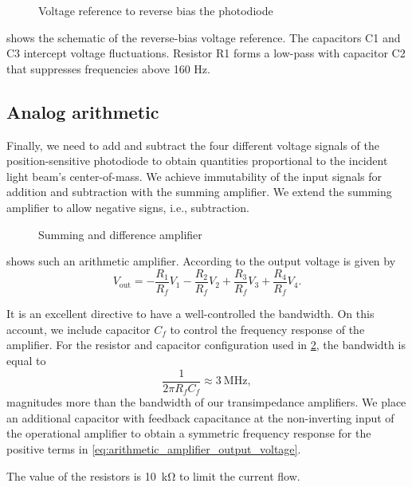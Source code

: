 \begin{figure}[H]
	\centering
	
	\caption{Voltage reference to reverse bias the photodiode}\label{fig:voltage_reference}
\end{figure}

 shows the schematic of the reverse-bias voltage reference.
The capacitors C1 and C3 intercept voltage fluctuations. 
Resistor R1 forms a low-pass with capacitor C2 that suppresses frequencies above 160 Hz.

\subsection{Analog arithmetic}

Finally, we need to add and subtract the four different voltage signals of the position-sensitive photodiode to obtain quantities proportional to the incident light beam's center-of-mass.
We achieve immutability of the input signals for addition and subtraction with the summing amplifier.
We extend the summing amplifier to allow negative signs, i.e., subtraction.

\begin{figure}[H]
	\centering
	
	\caption{Summing and difference amplifier}\label{fig:amplifier_arithmetic}
\end{figure}

 shows such an arithmetic amplifier.
According to \cite[p. 5]{Tietze15} the output voltage is given by
\begin{equation}
	V_\text{out}=-\frac{R_1}{R_f}V_1-\frac{R_2}{R_f}V_2+\frac{R_3}{R_f}V_3+\frac{R_4}{R_f}V_4.
	\label{eq:arithmetic_amplifier_output_voltage}
\end{equation}

It is an excellent directive to have a well-controlled the bandwidth.
On this account, we include capacitor $C_f$ to control the frequency response of the amplifier. 
For the resistor and capacitor configuration used in \cref{fig:amplifier_arithmetic}, the bandwidth is equal to
\begin{equation}
	\frac{1}{2\pi R_fC_f}\approx\SI{3}{\mega\hertz},
\end{equation}
magnitudes more than the bandwidth of our transimpedance amplifiers.
We place an additional capacitor with feedback capacitance at the non-inverting input of the operational amplifier to obtain a symmetric frequency response for the positive terms in \eqref{eq:arithmetic_amplifier_output_voltage}.

The value of the resistors is \SI{10}{\kilo\ohm} to limit the current flow.

